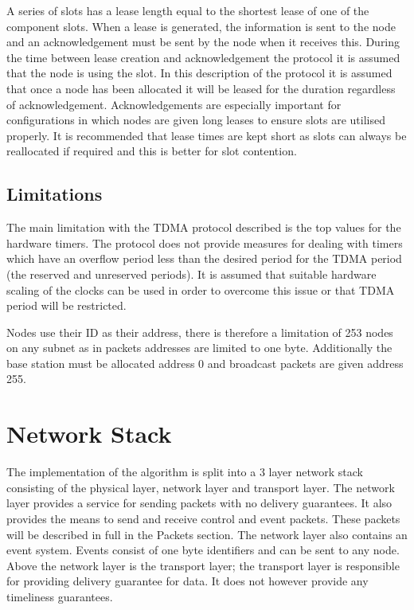 \documentclass[parskip]{cs4rep}
\begin{document}
A series of slots has a lease length equal to the shortest lease of one of the component slots.  When a lease is generated, the information is sent to the node and an acknowledgement must be sent by the node when it receives this. During the time between lease creation and acknowledgement the protocol it is assumed that the node is using the slot. In this description of the protocol it is assumed that once a node has been allocated it will be leased for the duration regardless of acknowledgement. Acknowledgements are especially important for configurations in which nodes are given long leases to ensure slots are utilised properly. It is recommended that lease times are kept short as slots can always be reallocated if required and this is better for slot contention.

\subsection{Limitations}

The main limitation with the TDMA protocol described is the top values for the hardware timers. The protocol does not provide measures for dealing with timers which have an overflow period less than the desired period for the TDMA period (the reserved and unreserved periods). It is assumed that suitable hardware scaling of the clocks can be used in order to overcome this issue or that TDMA period will be restricted.

Nodes use their ID as their address, there is therefore a limitation of 253 nodes on any subnet as in packets addresses are limited to one byte. Additionally the base station must be allocated address 0 and broadcast packets are given address 255.

\section{Network Stack}

The implementation of the algorithm is split into a 3 layer network stack consisting of the physical layer, network layer and transport layer. The network layer provides a service for sending packets with no delivery guarantees. It also provides the means to send and receive control and event packets. These packets will be described in full in the Packets section. The network layer also contains an event system. Events consist of one byte identifiers and can be sent to any node. Above the network layer is the transport layer; the transport layer is responsible for providing delivery guarantee for data. It does not however provide any timeliness guarantees.
\end{document}
